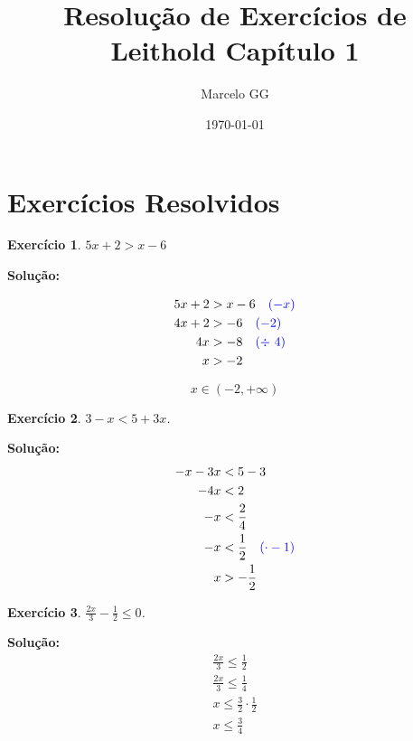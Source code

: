 \documentclass[12pt]{article}
\newtheorem{exercicio}{Exercício}
\begin{document}
\title{Resolução de Exercícios de Leithold Capítulo 1}
\author{Marcelo GG}
\date{\today}
\maketitle

\section*{Exercícios Resolvidos}

\begin{exercicio}
\( 5x + 2 > x - 6 \)
\end{exercicio}

\textbf{Solução:}

\begin{align}
5x + 2 &> x - 6 \quad \textcolor{blue}{(-x)}\\
4x + 2 &> - 6 \quad \textcolor{blue}{(-2)} \\
4x &> -8 \quad \textcolor{blue}{(\div\ 4)}\\
x &> -2\\
\end{align}

\[
x \in (-2, +\infty)
\]

\hrulefill{}

\begin{exercicio}
 $3-x<5+3x$.
\end{exercicio}

\textbf{Solução:}
\setcounter{equation}{0}
\begin{align}
-x-3x&<5-3\\
-4x&<2\\
-x&<\frac{2}{4}\\
-x&<\frac{1}{2} \quad \textcolor{blue}{(\cdot -1)}\\
x&>-\frac{1}{2}
\end{align}

\hrulefill{}

\begin{exercicio}
 \( \frac{2x}{3} - \frac{1}{2} \leq 0 \).
\end{exercicio}

\textbf{Solução:}
\setcounter{equation}{0}
\begin{align}
\frac{2x}{3} \leq \frac{1}{2} \\
\frac{2x}{3} \leq \frac{1}{4} \\
x \leq \frac{3}{2} \cdot \frac{1}{2} \\
x \leq \frac{3}{4} 
\end{align}
\end{document}
